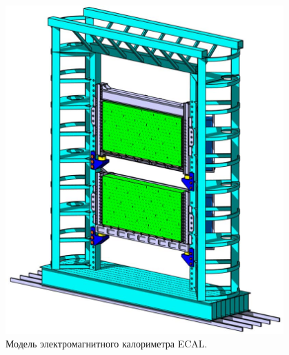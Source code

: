 \begin{minipage}[t]{0.495\textwidth}
\begin{figure}[H]
\centering
\includegraphics[width=0.95\textwidth]{pictures/CBM_ECAL_new.png}
\caption{Модель электромагнитного калориметра ECAL.}
\label{fig:ECAL}
\end{figure}
\end{minipage}
